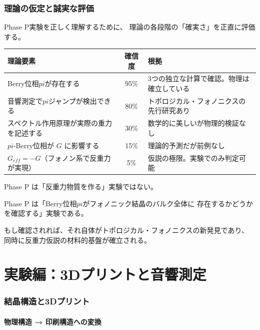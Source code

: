 \documentclass[11pt,a4paper]{article}
\def\pi{pi}%
\def\mathrm#1{#1}%
\def\textbf#1{#1}%
\begin{document}
\section{理論の仮定と誠実な評価}

Phase P実験を正しく理解するために、
理論の各段階の「確実さ」を正直に評価する。

\begin{center}
\begin{tabular}{lcp{6cm}}
\toprule
理論要素 & 確信度 & 根拠 \\
\midrule
Berry位相$\pi$が存在する & \textbf{95\%} & 3つの独立な計算で確認。物理は確立している \\
音響測定で$\pi$ジャンプが検出できる & \textbf{80\%} & トポロジカル・フォノニクスの先行研究あり \\
スペクトル作用原理が実際の重力を記述する & 30\% & 数学的に美しいが物理的検証なし \\
$\pi$-Berry位相が $G$ に影響する & 15\% & 理論的予測だが前例なし \\
$G_{\mathrm{eff}} = -G$（フォノン系で反重力が実現） & 5\% & 仮説の極限。実験でのみ判定可能 \\
\bottomrule
\end{tabular}
\end{center}

\begin{tcolorbox}[colback=yellow!5,colframe=yellow!60!black,title=正直な評価]
Phase P は「反重力物質を作る」実験ではない。

Phase P は「Berry位相$\pi$がフォノニック結晶のバルク全体に
存在するかどうかを確認する」実験である。

もし確認されれば、それ自体がトポロジカル・フォノニクスの新発見であり、
同時に反重力仮説の\textbf{材料的基盤}が確立される。
\end{tcolorbox}


\part{実験編：3Dプリントと音響測定}

\section{結晶構造と3Dプリント}

\subsection{物理構造 → 印刷構造への変換}
\end{document}
